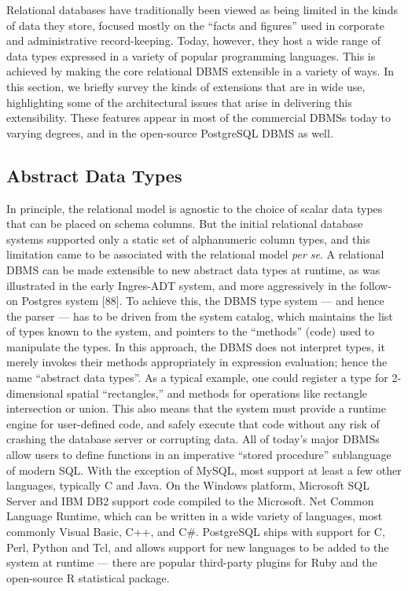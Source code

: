 \documentclass[a4paper,11pt,twoside,openright]{book}
\begin{document}
Relational databases have traditionally been viewed as being limited in
the kinds of data they store, focused mostly on the ``facts and
figures'' used in corporate and administrative record-keeping. Today,
however, they host a wide range of data types expressed in a variety of
popular programming languages. This is achieved by making the core
relational DBMS extensible in a variety of ways. In this section, we
briefly survey the kinds of extensions that are in wide use,
highlighting some of the architectural issues that arise in delivering
this extensibility. These features appear in most of the commercial
DBMSs today to varying degrees, and in the open-source PostgreSQL DBMS
as well.

\hypertarget{abstract-data-types}{%
\subsection{Abstract Data Types}\label{abstract-data-types}}

In principle, the relational model is agnostic to the choice of scalar
data types that can be placed on schema columns. But the initial
relational database systems supported only a static set of alphanumeric
column types, and this limitation came to be associated with the
relational model \emph{per se}. A relational DBMS can be made extensible
to new abstract data types at runtime, as was illustrated in the early
Ingres-ADT system, and more aggressively in the follow-on Postgres
system {[}88{]}.
  To achieve this, the DBMS type system --- and hence the parser --- has
  to be driven from the system catalog, which maintains the list of
  types known to the system, and pointers to the ``methods'' (code) used
  to manipulate the types. In this approach, the DBMS does not interpret
  types, it merely invokes their methods appropriately in expression
  evaluation; hence the name ``abstract data types''. As a typical
  example, one could register a type for 2-dimensional spatial
  ``rectangles,'' and methods for operations like rectangle intersection
  or union. This also means that the system must provide a runtime
  engine for user-defined code, and safely execute that code without any
  risk of crashing the database server or corrupting data. All of
  today's major DBMSs allow users to define functions in an imperative
  ``stored procedure'' sublanguage of modern SQL. With the exception of
  MySQL, most support at least a few other languages, typically C and
  Java. On the Windows platform, Microsoft SQL Server and IBM DB2
  support code compiled to the Microsoft. Net Common Language Runtime,
  which can be written in a wide variety of languages, most commonly
  Visual Basic, C++, and C\#. PostgreSQL ships with support for C, Perl,
  Python and Tcl, and allows support for new languages to be added to
  the system at runtime --- there are popular third-party plugins for
  Ruby and the open-source R statistical package.
\end{document}
